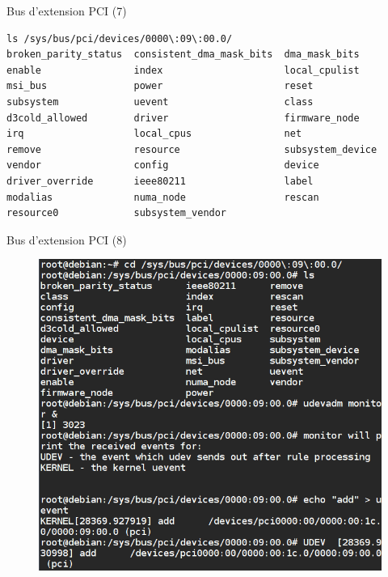 \documentclass[12pt, t]{beamer}
\begin{document}
\begin{frame}{Bus d'extension PCI (7)}

    \vspace{15pt}
    \lstlspci

\end{frame}

{
    \begin{lstlisting}[basicstyle=\scriptsize]
ls /sys/bus/pci/devices/0000\:09\:00.0/
broken_parity_status  consistent_dma_mask_bits  dma_mask_bits
enable                index                     local_cpulist
msi_bus               power                     reset
subsystem             uevent                    class
d3cold_allowed        driver                    firmware_node
irq                   local_cpus                net
remove                resource                  subsystem_device
vendor                config                    device
driver_override       ieee80211                 label
modalias              numa_node                 rescan
resource0             subsystem_vendor
    \end{lstlisting}
}

\begin{frame}{Bus d'extension PCI (8)}

    \begin{figure}
        \centering
        \includegraphics[scale=0.45]{udevadm.png}
    \end{figure}

\end{frame}
\end{document}
